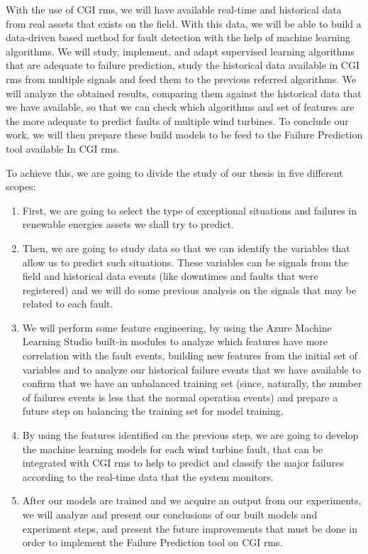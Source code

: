 With the use of CGI \acrshort{rms}, we will have available real-time and historical data from real assets that exists on the field. With this data, we will be able to build a data-driven based method for fault detection with the help of machine learning algorithms. We will study, implement, and adapt supervised learning algorithms that are adequate to failure prediction, study the historical data available in CGI \acrshort{rms} from multiple signals and feed them to the previous referred algorithms. We will analyze the obtained results, comparing them against the historical data that we have available, so that we can check which algorithms and set of features are the more adequate to predict faults of multiple wind turbines. To conclude our work, we will then prepare these build models to be feed to the Failure Prediction tool available In CGI \acrshort{rms}.

To achieve this, we are going to divide the study of our thesis in five different scopes:

\begin{enumerate}
\item 
First, we are going to select the type of exceptional situations and failures in renewable energies assets we shall try to predict.

\item 
Then, we are going to study data so that we can identify the variables that allow us to predict such situations. These variables can be signals from the field and historical data events (like downtimes and faults that were registered) and we will do some previous analysis on the signals that may be related to each fault.

\item
We will perform some feature engineering, by using the Azure Machine Learning Studio built-in modules to analyze which features have more correlation with the fault events, building new features from the initial set of variables and to analyze our historical failure events that we have available to confirm that we have an unbalanced training set (since, naturally, the number of failures events is less that the normal operation events) and prepare a future step on balancing the training set for model training.

\item 
By using the features identified on the previous step, we are going to develop the machine learning models for each wind turbine fault, that can be integrated with CGI \acrshort{rms} to help to predict and classify the major failures according to the real-time data that the system monitors.

\item 
After our models are trained and we acquire an output from our experiments, we will analyze and present our conclusions of our built models and experiment steps, and present the future improvements that must be done in order to implement the Failure Prediction tool on CGI \acrshort{rms}.

\end{enumerate}


